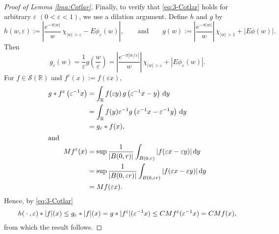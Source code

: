 \documentclass[../dissertation.tex]{subfiles}
\begin{document}
\begin{proof}[Proof of Lemma \ref{lma:Cotlar}]
    Finally, to verify that \eqref{eq:3-Cotlar} holds for arbitrary $\varepsilon$ 
    $(0 < \varepsilon < 1)$, we use a dilation argument. Define $h$ and $g$ by 
    \[
        h(w, \varepsilon) := \left| \frac{e^{-\pi |w|}}{w} \, \chi_{|w|>\varepsilon} 
    	   	- E \phi_\varepsilon(w) \right|,
        \qquad \text{and} \qquad
        g(w) 
        	:=  
        		\left| \frac{e^{-\pi |w|}}{w}\right|  \, \chi_{|w|>1}  
        			+ \left| E \phi(w) \right|.
    \]
    Then 
    \[
        g_\varepsilon(w) 
          = \frac{1}{\varepsilon} g\left(\frac{w}{\varepsilon}\right)
          = \left| \frac{e^{-\pi |w/\varepsilon|}}{w} \right| \, \chi_{|w|>\varepsilon} 
          	+ \left| E \phi_\varepsilon(w) \right|.
    \]
    For $f \in \mathscr S(\mathbb R)$ and $f^\varepsilon(x):= f(\varepsilon x)$,
    \begin{align*}
        g*f^\varepsilon\left(\varepsilon^{-1} x \right)
            &= \int_{\mathbb R} 
            		f(\varepsilon y) \, g\left( \varepsilon^{-1} x - y \right) 
            	\, \mathrm{d}y \\
            &= \int_{\mathbb R} 
            		f(y) \varepsilon^{-1} 
            			g\left( \varepsilon^{-1} x - \varepsilon^{-1} y \right) 
            	\, \mathrm{d}y \\
            &= g_\varepsilon * f(x), \\
        \intertext{and}
        M f^\varepsilon(x)
            &= \sup \frac{1}{|B(0, r)|} 
            	\int_{B(0, r)} |f(\varepsilon x - \varepsilon y)| \, \mathrm{d}y \\
            &= \sup \frac{1}{|B(0, \varepsilon r)|} 
            	\int_{B(0, \varepsilon r)} |f(\varepsilon x - \varepsilon y)| \, \mathrm{d}y \\
            &= M f(\varepsilon x).
    \end{align*}
    Hence, by \eqref{eq:3-Cotlar}
    \begin{align*}
        h(\kern 0.5ex \cdot \kern 0.5ex, \varepsilon) * |f|(x) 
            \leq g_\varepsilon * |f|(x) 
            = g*|f^{\varepsilon}|(\varepsilon^{-1} x) 
            \leq C M f^{\varepsilon}(\varepsilon^{-1} x)
            =C M f(x),
    \end{align*}
    from which the result follows.
\end{proof}
\end{document}
